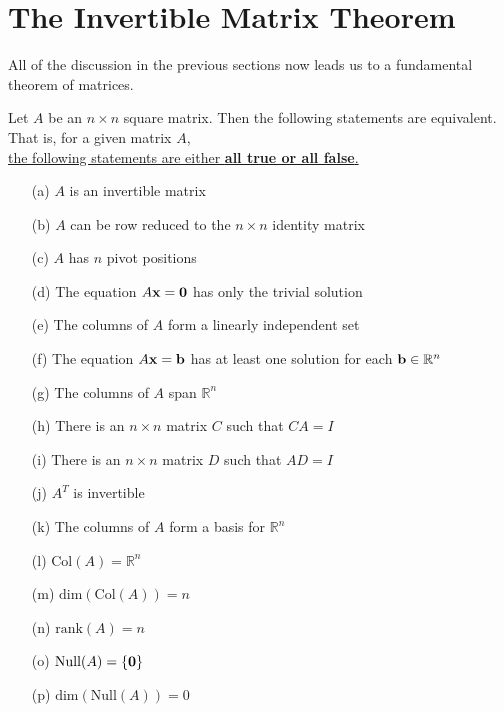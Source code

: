 \newpage
\section{The Invertible Matrix Theorem}
All of the discussion in the previous sections now leads us to a fundamental theorem of matrices.
\begin{thm}
    Let $A$ be an $n \times n$ square matrix.  Then the following statements are
    equivalent.  That is, for a given matrix $A$, \\
    \underline{the following statements are either {\bf all true or
    all false}.}
    \begin{enumerate}
        \item[(a)] $A$ is an invertible matrix
        \item[(b)] $A$ can be row reduced to the $n \times n$ identity matrix
        \item[(c)] $A$ has $n$ pivot positions
        \item[(d)] The equation $A {\bf x} = {\bf 0}$ has only the trivial solution
        \item[(e)] The columns of $A$ form a linearly independent set
        \item[(f)] The equation $A {\bf x} = {\bf b}$ has at least one solution for each ${\bf b} \in
            \mathbb{R}^n$
        \item[(g)] The columns of $A$ span $\mathbb{R}^n$
        \item[(h)] There is an $n \times n$ matrix $C$ such that $CA = I$
        \item[(i)] There is an $n \times n$ matrix $D$ such that $AD = I$
        \item[(j)] $A^T$ is invertible
        \item[(k)] The columns of $A$ form a basis for $\mathbb{R}^n$
        \item[(l)] $\text{Col}(A) = \mathbb{R}^n$
        \item[(m)] $\text{dim}(\text{Col}(A)) = n$
        \item[(n)] $\text{rank}(A) = n$
        \item[(o)] $\text{Null}(A) = \{ {\bf 0} \}$
        \item[(p)] $\text{dim}(\text{Null}(A)) = 0$
    \end{enumerate}
\end{thm}

